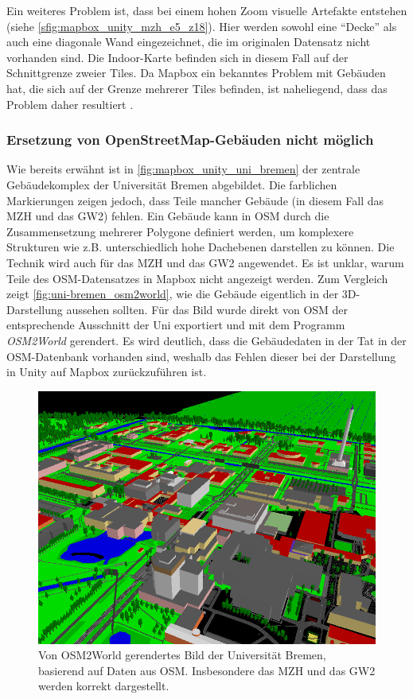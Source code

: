 Ein weiteres Problem ist, dass bei einem hohen Zoom visuelle Artefakte entstehen (siehe \autoref{sfig:mapbox_unity_mzh_e5_z18}).
Hier werden sowohl eine \enquote{Decke} als auch eine diagonale Wand eingezeichnet, die im originalen Datensatz nicht vorhanden sind.
Die Indoor-Karte befinden sich in diesem Fall auf der Schnittgrenze zweier Tiles.
Da Mapbox ein bekanntes Problem mit Gebäuden hat, die sich auf der Grenze mehrerer Tiles befinden, ist naheliegend, dass das Problem daher resultiert \autocite{Mapbox2018c}.

\subsubsection*{Ersetzung von OpenStreetMap-Gebäuden nicht möglich}
Wie bereits erwähnt ist in \autoref{fig:mapbox_unity_uni_bremen} der zentrale Gebäudekomplex der Universität Bremen abgebildet.
Die farblichen Markierungen zeigen jedoch, dass Teile mancher Gebäude (in diesem Fall das MZH und das GW2) fehlen.
Ein Gebäude kann in OSM durch die Zusammensetzung mehrerer Polygone definiert werden, um komplexere Strukturen wie z.B. unterschiedlich hohe Dachebenen darstellen zu können.
Die Technik wird auch für das MZH und das GW2 angewendet.
Es ist unklar, warum Teile des OSM-Datensatzes in Mapbox nicht angezeigt werden.
Zum Vergleich zeigt \autoref{fig:uni-bremen_osm2world}, wie die Gebäude eigentlich in der 3D-Darstellung aussehen sollten.
Für das Bild wurde direkt von OSM der entsprechende Ausschnitt der Uni exportiert und mit dem Programm \emph{OSM2World} gerendert.
Es wird deutlich, dass die Gebäudedaten in der Tat in der OSM-Datenbank vorhanden sind, weshalb das Fehlen dieser bei der Darstellung in Unity auf Mapbox zurückzuführen ist.

\begin{figure}[t]
    \centering
    \includegraphics[width=\linewidth]{figures/uni-bremen_osm2world}
    \caption{Von OSM2World gerendertes Bild der Universität Bremen, basierend auf Daten aus OSM.\@ %
    Insbesondere das MZH und das GW2 werden korrekt dargestellt.%
    }
    \label{fig:uni-bremen_osm2world}
\end{figure}

